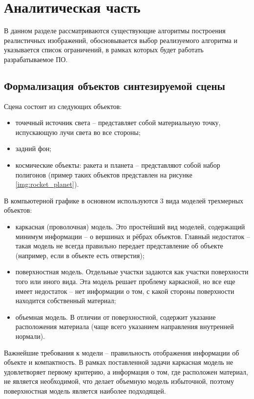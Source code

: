 \chapter{Аналитическая часть}

В данном разделе рассматриваются существующие алгоритмы построения реалистичных изображений, обосновывается выбор реализуемого алгоритма и указывается список ограничений, в рамках которых будет работать разрабатываемое ПО.

\section{Формализация объектов синтезируемой сцены}
Сцена состоит из следующих объектов:
\begin{itemize}
    \item точечный источник света -- представляет собой материальную точку, испускающую лучи света во все стороны;
    \item задний фон;
    \item космические объекты: ракета и планета -- представляют собой набор полигонов (пример таких объектов представлен на рисунке \ref{img:rocket_planet}).
\end{itemize}


В компьютерной графике в основном используются 3 вида моделей трехмерных объектов:
\begin{itemize}
    \item каркасная (проволочная) модель. Это простейший вид моделей, содержащий минимум информации -- о вершинах и рёбрах объектов. Главный недостаток -- такая модель не всегда правильно передает представление об объекте (например, если в объекте есть отверстия);
    \item поверхностная модель. Отдельные участки задаются как участки поверхности того или иного вида. Эта модель решает проблему каркасной, но все еще имеет недостаток -- нет информации о том, с какой стороны поверхности находится собственный материал;
    \item объемная модель. В отличии от поверхностной, содержит указание расположения материала (чаще всего указанием направления внутренней нормали). 
\end{itemize} 

Важнейшие требования к модели -- правильность отображения информации об объекте и компактность. В рамках поставленной задачи каркасная модель не удовлетворяет первому критерию, а информация о том, где расположен материал, не является необходимой, что делает объемную модель избыточной, поэтому поверхностная модель является наиболее подходящей. 

